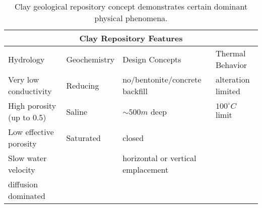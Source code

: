 %
\begin{table}[h!]
  \centering
  \footnotesize{
  \begin{tabular}{|l|l|l|l|}
    \multicolumn{4}{c}{\textbf{Clay Repository Features}}\\
    \hline
     Hydrology & Geochemistry & Design Concepts & Thermal Behavior \\ 
    \hline
    Very low conductivity&Reducing&no/bentonite/concrete backfill &alteration limited\\
    High porosity (up to 0.5)&Saline&$\sim500m$ deep&$100^\circ C$ limit \\
    Low effective porosity&Saturated&closed&\\
    Slow water velocity &&horizontal or vertical emplacement&\\
    diffusion dominated &&&\\
    \hline
  \end{tabular}
  \caption[Clay repository features.]{Clay geological repository 
  concept demonstrates certain dominant physical phenomena. }
  \label{tab:clay_tab}
  }
\end{table}


